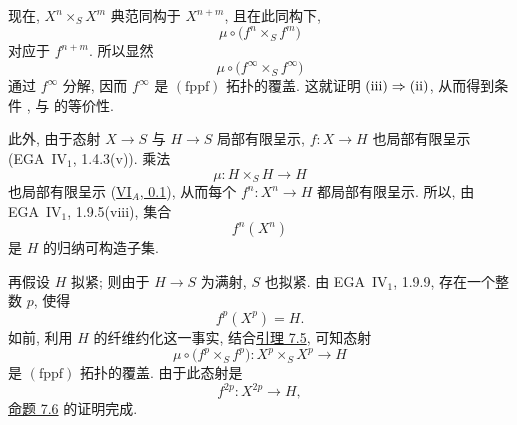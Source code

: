 现在, \(X^n\times_S X^m\) 典范同构于 \(X^{n+m}\),
且在此同构下,
\[
  \mu\circ\bigl(f^n\times_S f^m\bigr)
\]
对应于 \(f^{n+m}\). 所以显然
\[
  \mu\circ
  \bigl(f^\infty\times_S f^\infty\bigr)
\]
通过 \(f^\infty\) 分解, 因而 \(f^\infty\)
是 \((\mathrm{fppf})\) 拓扑的覆盖.
这就证明 \(\textup{(iii)}\Rightarrow\textup{(ii)}\),
从而得到条件 \textup{},
\textup{} 与
\textup{} 的等价性.

此外, 由于态射 \(X\to S\) 与 \(H\to S\) 局部有限呈示,
\(f:X\to H\) 也局部有限呈示 (EGA~IV\(_1\), 1.4.3\textup{(v)}).
乘法
\[
  \mu:H\times_S H\longrightarrow H
\]
也局部有限呈示 (\hyperref[sga3:VIA:0.1]{VI\(_A\), 0.1}),
从而每个 \(f^n:X^n\to H\) 都局部有限呈示.
所以, 由 EGA~IV\(_1\), 1.9.5\textup{(viii)}, 集合
\[
  f^n(X^n)
\]
是 \(H\) 的归纳可构造子集.

再假设 \(H\) 拟紧; 则由于 \(H\to S\) 为满射, \(S\) 也拟紧.
由 EGA~IV\(_1\), 1.9.9, 存在一个整数 \(p\), 使得
\[
  f^p(X^p)=H.
\]
如前, 利用 \(H\) 的纤维约化这一事实,
结合\hyperref[lem:sga3-VIB-7.5]{引理 7.5}, 可知态射
\label{form:sga3-VIB-7.6-f2p-covering}%
\[
  \mu\circ\bigl(f^p\times_S f^p\bigr):
  X^p\times_S X^p\longrightarrow H
\]
是 \((\mathrm{fppf})\) 拓扑的覆盖.
由于此态射是
\[
  f^{2p}:X^{2p}\longrightarrow H,
\]
\hyperref[prop:sga3-VIB-7.6]{命题 7.6} 的证明完成.

